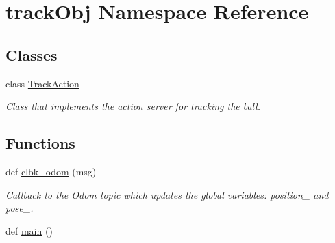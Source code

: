 \hypertarget{namespacetrackObj}{}\section{track\+Obj Namespace Reference}
\label{namespacetrackObj}
\subsection*{Classes}
\begin{DoxyCompactItemize}
\item 
class \hyperlink{classtrackObj_1_1TrackAction}{Track\+Action}
\begin{DoxyCompactList}\small\item\em Class that implements the action server for tracking the ball. \end{DoxyCompactList}\end{DoxyCompactItemize}
\subsection*{Functions}
\begin{DoxyCompactItemize}
\item 
def \hyperlink{namespacetrackObj_a7115a4055cdfb15c1ef11a408d59f842}{clbk\+\_\+odom} (msg)
\begin{DoxyCompactList}\small\item\em Callback to the Odom topic which updates the global variables\+: position\+\_\+ and pose\+\_\+. \end{DoxyCompactList}\item 
def \hyperlink{namespacetrackObj_a512880f3c0e453e0fca57664838fef0d}{main} ()
\end{DoxyCompactItemize}
